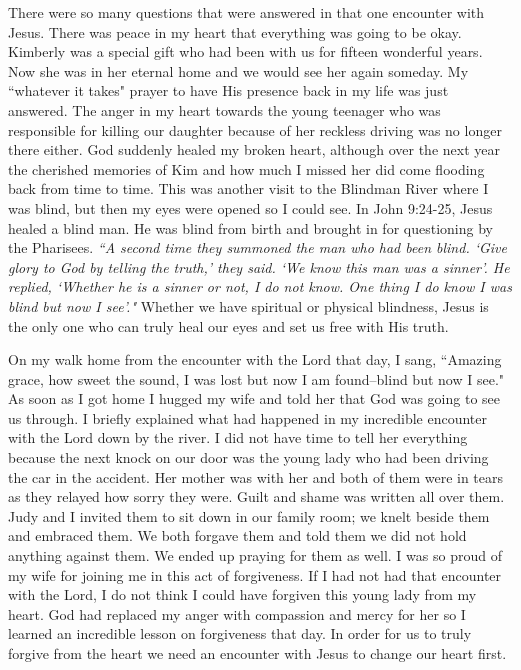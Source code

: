 \documentclass[oneside,12pt]{book}
\begin{document}
There were so many questions that were answered in that one encounter with Jesus. There was peace in my heart that everything was going to be okay. Kimberly was a special gift who had been with us for fifteen wonderful years. Now she was in her eternal home and we would see her again someday. My ``whatever it takes" prayer to have His presence back in my life was just answered. The anger in my heart towards the young teenager who was responsible for killing our daughter because of her reckless driving was no longer there either. God suddenly healed my broken heart, although over the next year the cherished memories of Kim and how much I missed her did come flooding back from time to time. This was another visit to the Blindman River where I was blind, but then my eyes were opened so I could see. In John 9:24-25, Jesus  healed a blind man. He was blind from birth and brought in for questioning by the Pharisees. \textit{``A second time they summoned the man who had been blind. `Give glory to God by telling the truth,' they said. `We know this man was a sinner'. He replied, `Whether he is a sinner or not, I do not know. One thing I do know I was blind but now I see'."} Whether we have spiritual or physical blindness, Jesus is the only one who can truly heal our eyes and set us free with His truth.

On my walk home from the encounter with the Lord that day, I sang, ``Amazing grace, how sweet the sound, I was lost but now I am found--blind but now I see." As soon as I got home I hugged my wife and told her that God was going to see us through. I briefly explained what had happened in my incredible encounter with the Lord down by the river. I did not have time to tell her everything because the next knock on our door was the young lady who had been driving the car in the accident. Her mother was with her and both of them were in tears as they relayed how sorry they were. Guilt and shame was written all over them. Judy and I invited them to sit down in our family room; we knelt beside them and embraced them. We both forgave them and told them we did not hold anything against them. We ended up praying for them as well. I was so proud of my wife for joining me in this act of forgiveness. If I had not had that encounter with the Lord, I do not think I could have forgiven this young lady from my heart. God had replaced my anger with compassion and mercy for her so I learned an incredible lesson on forgiveness that day. In order for us to truly forgive from the heart we need an encounter with Jesus to change our heart first.
\end{document}
